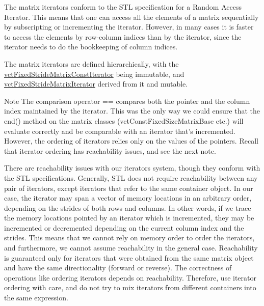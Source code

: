 The matrix iterators conform to the S\-T\-L specification for a Random Access Iterator. This means that one can access all the elements of a matrix sequentially by subscripting or incrementing the iterator. However, in many cases it is faster to access the elements by row-\/column indices than by the iterator, since the iterator needs to do the bookkeeping of column indices.

The matrix iterators are defined hierarchically, with the \hyperlink{classvct_fixed_stride_matrix_const_iterator}{vct\-Fixed\-Stride\-Matrix\-Const\-Iterator} being immutable, and \hyperlink{classvct_fixed_stride_matrix_iterator}{vct\-Fixed\-Stride\-Matrix\-Iterator} derived from it and mutable.

\begin{DoxyNote}{Note}
The comparison operator == compares both the pointer and the column index maintained by the iterator. This was the only way we could ensure that the end() method on the matrix classes (vct\-Const\-Fixed\-Size\-Matrix\-Base etc.) will evaluate correctly and be comparable with an iterator that's incremented. However, the ordering of iterators relies only on the values of the pointers. Recall that iterator ordering has reachability issues, and see the next note.

There are reachability issues with our iterators system, though they conform with the S\-T\-L specifications. Generally, S\-T\-L does not require reachability between any pair of iterators, except iterators that refer to the same container object. In our case, the iterator may span a vector of memory locations in an arbitrary order, depending on the strides of both rows and columns. In other words, if we trace the memory locations pointed by an iterator which is incremented, they may be incremented or decremented depending on the current column index and the strides. This means that we cannot rely on memory order to order the iterators, and furthermore, we cannot assume reachability in the general case. Reachability is guaranteed only for iterators that were obtained from the same matrix object and have the same directionality (forward or reverse). The correctness of operations like ordering iterators depends on reachability. Therefore, use iterator ordering with care, and do not try to mix iterators from different containers into the same expression. 
\end{DoxyNote}


